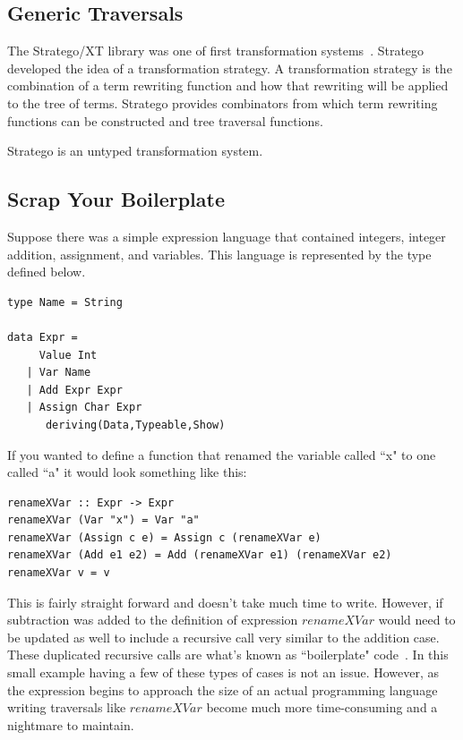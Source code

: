 \subsection{Generic Traversals}
The Stratego/XT library was one of first transformation systems~\citep{stratego}. Stratego developed the idea of a transformation strategy. A transformation strategy is the combination of a term rewriting function and how that rewriting will be applied to the tree of terms. Stratego provides combinators from which term rewriting functions can be constructed and tree traversal functions\citep{stratego}.

Stratego is an untyped transformation system.
\subsection{Scrap Your Boilerplate}\label{syb}

	Suppose there was a simple expression language that contained integers, integer addition, assignment, and variables. This language is represented by the type defined below.
	
	\begin{verbatim}
type Name = String

data Expr =
     Value Int
   | Var Name
   | Add Expr Expr
   | Assign Char Expr
      deriving(Data,Typeable,Show)
	\end{verbatim}
	
	If you wanted to define a function that renamed the variable called ``x" to one called ``a" it would look something like this:
	
	\begin{verbatim}
renameXVar :: Expr -> Expr
renameXVar (Var "x") = Var "a"
renameXVar (Assign c e) = Assign c (renameXVar e)
renameXVar (Add e1 e2) = Add (renameXVar e1) (renameXVar e2)
renameXVar v = v
	\end{verbatim}
	
	This is fairly straight forward and doesn't take much time to write. However, if subtraction was added to the definition of expression $renameXVar$ would need to be updated as well to include a recursive call very similar to the addition case. These duplicated recursive calls are what's known as ``boilerplate" code~\citep{syb}. In this small example having a few of these types of cases is not an issue. However, as the expression begins to approach the size of an actual programming language writing traversals like $renameXVar$ become much more time-consuming and a nightmare to maintain. 
	

